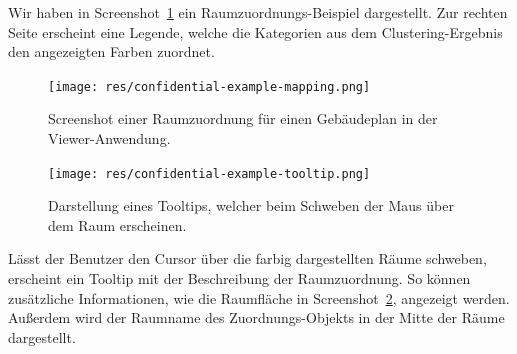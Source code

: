 Wir haben in Screenshot~\ref{fig:app-screenshot-mapping} ein Raumzuordnungs-Beispiel dargestellt.
Zur rechten Seite erscheint eine Legende, welche die Kategorien aus dem Clustering-Ergebnis den angezeigten Farben zuordnet.

\begin{figure}
    \texttt{[image: res/confidential-example-mapping.png]}
    \caption{Screenshot einer Raumzuordnung für einen Gebäudeplan in der Viewer-Anwendung.}
    \label{fig:app-screenshot-mapping}
\end{figure}

\begin{figure}
    \texttt{[image: res/confidential-example-tooltip.png]}
    \caption{Darstellung eines Tooltips, welcher beim Schweben der Maus über dem Raum erscheinen.}
    \label{fig:app-screenshot-tooltip}
\end{figure}

Lässt der Benutzer den Cursor über die farbig dargestellten Räume schweben, erscheint ein Tooltip mit der Beschreibung der Raumzuordnung.
So können zusätzliche Informationen, wie die Raumfläche in Screenshot~\ref{fig:app-screenshot-tooltip}, angezeigt werden.
Außerdem wird der Raumname des Zuordnungs-Objekts in der Mitte der Räume dargestellt.
